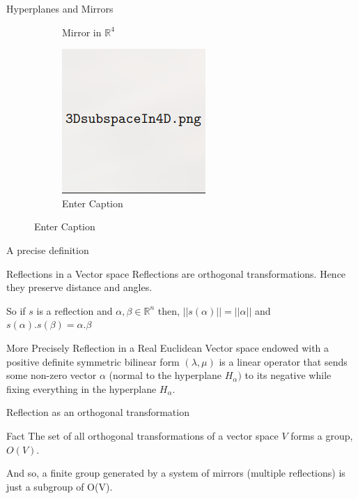 \documentclass[aspectratio=169,xcolor=dvipsnames]{beamer}
\begin{document}
\begin{frame}{Hyperplanes and Mirrors}
\begin{figure}
\begin{subfigure}[t]{0.3\textwidth}
        \caption{Mirror in $\mathbb{R}^4$}
        \label{fig:subim3}
    \end{subfigure}
\begin{figure}
    \centering
    \includegraphics[width=0.5\linewidth]{3DsubspaceIn4D.png}
    \caption{Enter Caption}
    \label{fig:enter-label}
\end{figure}
    \label{fig:image2}
    \end{figure}

\end{frame}



\begin{frame}{A precise definition}
    

    \begin{block}{Reflections in a Vector space}
    Reflections are \alert{orthogonal transformations}. Hence they preserve distance and angles. 

    So if $s$ is a reflection and $\alpha, \beta \in \mathbb{R}^n$ then, $||s(\alpha)||= ||\alpha||$ and $s(\alpha). s(\beta)=\alpha.\beta$
    \end{block}

    \begin{alertblock}{More Precisely}
        Reflection in a Real Euclidean Vector space endowed with a positive definite symmetric bilinear form $(\lambda , \mu)$ is a linear operator that sends some non-zero vector $\alpha$ (normal to the hyperplane $H_{\alpha})$ to its negative while fixing everything in the hyperplane $H_{\alpha}$.
    \end{alertblock}
\end{frame}


\begin{frame}{Reflection as an orthogonal transformation}
    \begin{block}{Fact}
        The set of all orthogonal transformations of a vector space $V$ forms a group, $O(V)$.
    \end{block}
    And so, a \alert{finite} group generated by a system of mirrors (multiple reflections) is just a subgroup of O(V).
\end{frame}
\end{document}

